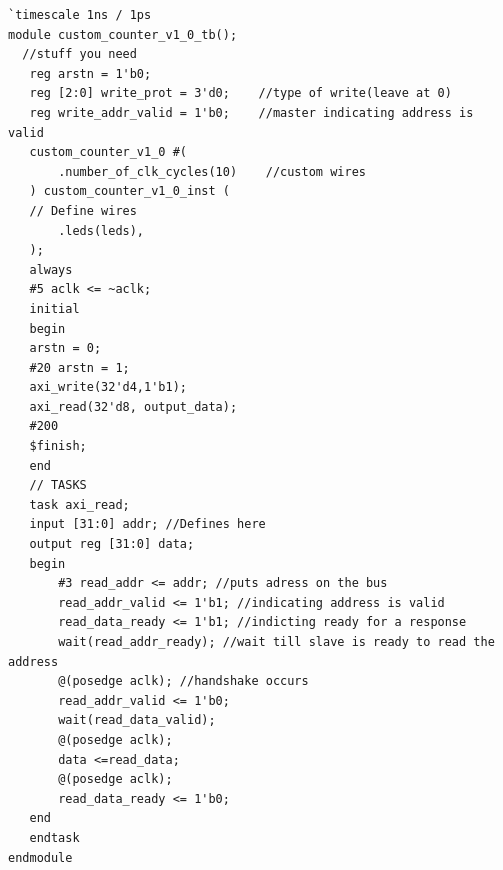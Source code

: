 \documentclass[12pt,landscape,a4paper]{article}
\begin{document}
\begin{tiny}
\begin{verbatim}
`timescale 1ns / 1ps
module custom_counter_v1_0_tb();
  //stuff you need
   reg arstn = 1'b0;
   reg [2:0] write_prot = 3'd0;    //type of write(leave at 0)
   reg write_addr_valid = 1'b0;    //master indicating address is valid
   custom_counter_v1_0 #(
       .number_of_clk_cycles(10)    //custom wires
   ) custom_counter_v1_0_inst (
   // Define wires
       .leds(leds),
   );
   always 
   #5 aclk <= ~aclk;
   initial 
   begin
   arstn = 0;
   #20 arstn = 1;
   axi_write(32'd4,1'b1);
   axi_read(32'd8, output_data);
   #200
   $finish; 
   end
   // TASKS
   task axi_read;
   input [31:0] addr; //Defines here
   output reg [31:0] data;
   begin
       #3 read_addr <= addr; //puts adress on the bus
       read_addr_valid <= 1'b1; //indicating address is valid
       read_data_ready <= 1'b1; //indicting ready for a response
       wait(read_addr_ready); //wait till slave is ready to read the address
       @(posedge aclk); //handshake occurs
       read_addr_valid <= 1'b0;
       wait(read_data_valid);
       @(posedge aclk);
       data <=read_data;
       @(posedge aclk);
       read_data_ready <= 1'b0;
   end
   endtask
endmodule
    \end{verbatim}
\end{tiny}
\end{document}
